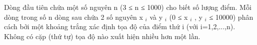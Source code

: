 Dòng đầu tiên chứa một số nguyên n (3 ≤ n ≤ 1000) cho biết số lượng điểm. Mỗi dòng trong số n dòng sau chứa 2 số nguyên x   $_    i   $   và y   $_    i   $   (0 ≤ x   $_    i   $   , y   $_    i   $   ≤ 10000) phân cách bởi một khoảng trắng xác định tọa độ của điểm thứ i (với i=1,2,...,n). Không có cặp (thứ tự) tọa độ nào xuất hiện nhiều hơn một lần.  

\